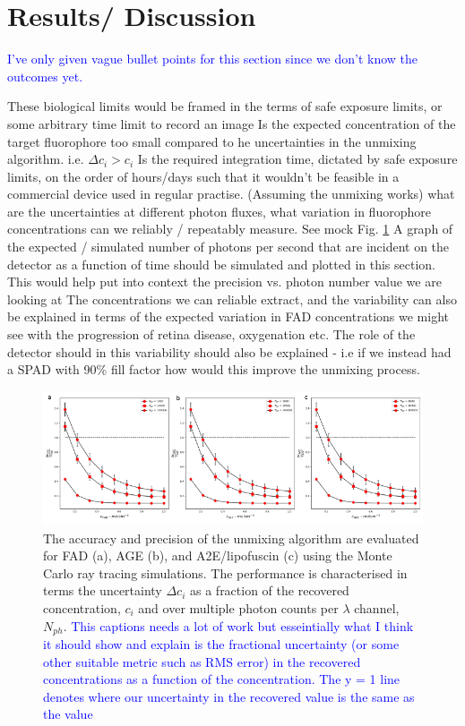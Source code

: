 \documentclass{optica-article}
\begin{document}
\section{Results/ Discussion}
\textcolor{blue}{I've only given vague bullet points for this section since we don't know the outcomes yet.}
\begin{outline}
        \1 These biological limits would be framed in the terms of safe exposure limits, or some arbitrary time limit to record an image
            \2 Is the expected concentration of the target fluorophore too small compared to he uncertainties in the unmixing algorithm. i.e. $\Delta c_{i} > c_{i}$
            \2 Is the required integration time, dictated by safe exposure limits, on the order of hours/days such that it wouldn't be feasible in a commercial device used in regular practise. 
            \2 (Assuming the unmixing works) what are the uncertainties at different photon fluxes, what variation in fluorophore concentrations can we reliably / repeatably measure. See mock Fig. \ref{fig:sflimperformance}
            \2 A graph of the expected / simulated number of photons per second that are incident on the detector as a function of time should be simulated and plotted in this section. This would help put into context the precision vs. photon number value we are looking at
        \1 The concentrations we can reliable extract, and the variability can also be explained in terms of the expected variation in FAD concentrations we might see with the progression of retina disease, oxygenation etc.
        \1 The role of the detector should in this variability should also be explained - i.e if we instead had a SPAD with 90\% fill factor how would this improve the unmixing process.
\end{outline}

\begin{figure}
    \centering
    \includegraphics[width = \textwidth]{Figures/SFLIMPerformance.png}
    \caption{The accuracy and precision of the unmixing algorithm are evaluated for FAD (a), AGE (b), and A2E/lipofuscin (c) using the Monte Carlo ray tracing simulations. The performance is characterised in terms the uncertainty $\Delta c_{i}$ as a fraction of the recovered concentration, $c_{i}$ and over multiple photon counts per $\lambda$ channel, $N_{ph}$. \textcolor{blue}{This captions needs a lot of work but esseintially what I think it should show and explain is the fractional uncertainty (or some other suitable metric such as RMS error) in the recovered concentrations as a function of the concentration. The y = 1 line denotes where our uncertainty in the recovered value is the same as the value}}
    \label{fig:sflimperformance}
\end{figure}

\end{document}
